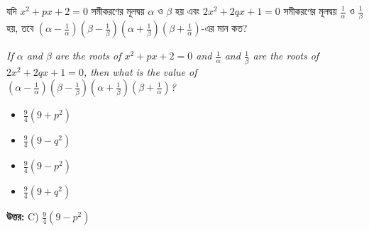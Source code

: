 \documentclass[12pt, a4paper]{article}
\begin{document}
\begin{tcolorbox}[questionbox={প্রশ্ন (Question) 39}]
    \noindent
    যদি $x^2 + px + 2 = 0$ সমীকরণের মূলদ্বয় $\alpha$ ও $\beta$ হয় এবং $2x^2 + 2qx + 1 = 0$ সমীকরণের মূলদ্বয় $\frac{1}{\alpha}$ ও $\frac{1}{\beta}$ হয়, তবে $\left(\alpha - \frac{1}{\alpha}\right)\left(\beta - \frac{1}{\beta}\right)\left(\alpha + \frac{1}{\beta}\right)\left(\beta + \frac{1}{\alpha}\right)$-এর মান কত?
    
    \vspace{0.8em}
    \begin{english}
    \noindent\textit{\color{darkgray}
    If $\alpha$ and $\beta$ are the roots of $x^2 + px + 2 = 0$ and $\frac{1}{\alpha}$ and $\frac{1}{\beta}$ are the roots of $2x^2 + 2qx + 1 = 0$, then what is the value of $\left(\alpha - \frac{1}{\alpha}\right)\left(\beta - \frac{1}{\beta}\right)\left(\alpha + \frac{1}{\beta}\right)\left(\beta + \frac{1}{\alpha}\right)$?
    }
    \end{english}
\end{tcolorbox}

\begin{itemize}[label={}, leftmargin=1cm, itemsep=0.5em]
    \item[\textbf{A)}] $\frac{9}{4}(9 + p^2)$
    \item[\textbf{B)}] $\frac{9}{4}(9 - q^2)$
    \item[\textbf{C)}] $\frac{9}{4}(9 - p^2)$
    \item[\textbf{D)}] $\frac{9}{4}(9 + q^2)$
\end{itemize}

\vspace{0.5em}
\begin{tcolorbox}[answerbox]
    \textbf{\color{success} উত্তর:} C) $\frac{9}{4}(9 - p^2)$
\end{tcolorbox}
\vspace{1em}
\end{document}
